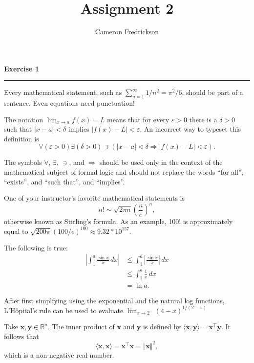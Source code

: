 \documentclass{article}
\title{Assignment 2}
\author{Cameron Fredrickson}
\date{}
\begin{document}
\maketitle

\noindent \textbf{Exercise 1}

\noindent \rule{\textwidth}{.1mm}

Every mathematical statement, such as $ \sum_{n=1}^\infty 1/n^2 = \pi^2/6$, should be part of a sentence. Even equations need punctuation!

The notation $ \lim_{x \to a} f(x) = L$ means that for every $ \varepsilon > 0$ there is a $ \delta > 0$ such that $|x-a| < \delta$ implies $|f(x)-L| < \varepsilon$. An incorrect way to typeset this definition is \begin{equation*}
\forall \left( \varepsilon > 0 \right) \exists \left( \delta > 0 \right) \ni \left( |x-a| < \delta \Longrightarrow |f(x)-L| < \varepsilon \right).
\end{equation*}

The symbols $\forall$, $\exists$, $\ni$, and $\Longrightarrow$ should be used only in the context of the mathematical subject of formal logic and should not replace the words ``for all'', ``exists'', and ``such that'', and ``implies''.

One of your instructor's favorite mathematical statements is \begin{equation*}
n! \sim \sqrt{2 \pi n} \left( \frac{n}{e} \right)^{n},
\end{equation*} otherwise known as Stirling's formula. As an example,   100! is approximately equal to $ \sqrt{200 \pi} \left( 100/e \right)^{100} \approx 9.32 * 10^{157}.$

The following is true: \begin{align*}
\left| \int_1^a \frac{\sin x}{x} \, dx\right| &\leq \int_1^a \left|\frac{\sin x}{x}\right| \, dx \\
&\leq \int_1^a \frac{1}{x} \, dx \\
&= \ln a.
\end{align*}

After first simplfying using the exponential and the natural log functions, L'H\^opital's rule can be used to evaluate $ \lim_{x \to 2^-} (4-x)^{1/(2-x)}$

Take $\mathbf{x, y} \in \mathbb{R}^n$. The inner product of $\mathbf{x}$ and $\mathbf{y}$ is defined by $\langle \mathbf{x},\mathbf{y} \rangle = \mathbf{x}^\intercal \mathbf{y}$. It follows that \begin{equation*}
\langle \mathbf{x},\mathbf{x} \rangle = \mathbf{x}^\intercal \mathbf{x} = \Vert \mathbf{x} \Vert^2,
\end{equation*} which is a non-negative real number.
\end{document}
